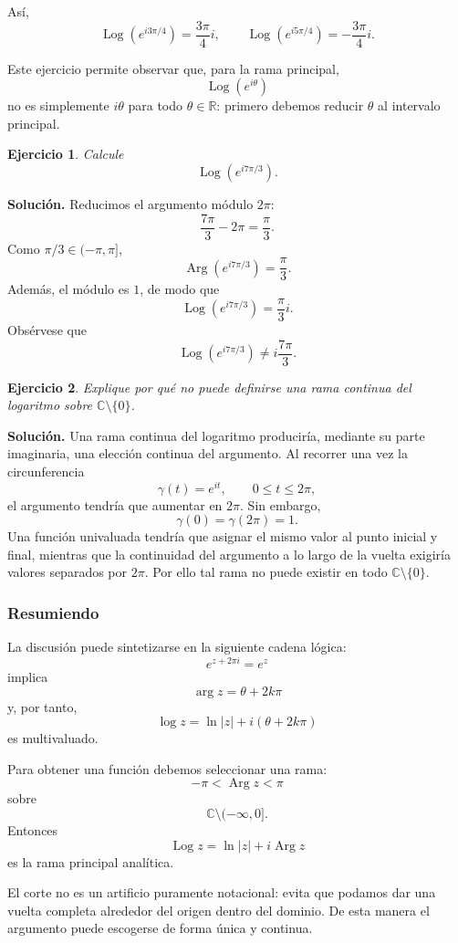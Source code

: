 \documentclass[12pt]{article}
\DeclareMathOperator{\Arg}{Arg}
\DeclareMathOperator{\Log}{Log}
\newtheorem{ejercicio}{Ejercicio}[section]
\begin{document}
Así,
\[
\boxed{
\Log(e^{i3\pi/4})=\frac{3\pi}{4}i,
\qquad
\Log(e^{i5\pi/4})=-\frac{3\pi}{4}i.
}
\]

Este ejercicio permite observar que, para la rama principal,
\[
\Log(e^{i\theta})
\]
no es simplemente $i\theta$ para todo $\theta\in\mathbb R$: primero debemos
reducir $\theta$ al intervalo principal.

\begin{ejercicio}
Calcule
\[
\Log(e^{i7\pi/3}).
\]
\end{ejercicio}

\textbf{Solución.}
Reducimos el argumento módulo $2\pi$:
\[
\frac{7\pi}{3}-2\pi
=
\frac{\pi}{3}.
\]
Como $\pi/3\in(-\pi,\pi]$,
\[
\Arg(e^{i7\pi/3})=\frac{\pi}{3}.
\]
Además, el módulo es $1$, de modo que
\[
\boxed{
\Log(e^{i7\pi/3})=\frac{\pi}{3}i.
}
\]
Obsérvese que
\[
\boxed{
\Log(e^{i7\pi/3})\neq i\frac{7\pi}{3}.
}
\]

\begin{ejercicio}
Explique por qué no puede definirse una rama continua del logaritmo sobre
$\mathbb C\setminus\{0\}$.
\end{ejercicio}

\textbf{Solución.}
Una rama continua del logaritmo produciría, mediante su parte imaginaria, una
elección continua del argumento. Al recorrer una vez la circunferencia
\[
\gamma(t)=e^{it},\qquad0\leq t\leq2\pi,
\]
el argumento tendría que aumentar en $2\pi$. Sin embargo,
\[
\gamma(0)=\gamma(2\pi)=1.
\]
Una función univaluada tendría que asignar el mismo valor al punto inicial y
final, mientras que la continuidad del argumento a lo largo de la vuelta
exigiría valores separados por $2\pi$. Por ello tal rama no puede existir en
todo $\mathbb C\setminus\{0\}$.
\subsubsection*{Resumiendo}
La discusión puede sintetizarse en la siguiente cadena lógica:
\[
\boxed{
e^{z+2\pi i}=e^z
}
\]
implica
\[
\boxed{
\arg z=\theta+2k\pi
}
\]
y, por tanto,
\[
\boxed{
\log z=\ln|z|+i(\theta+2k\pi)
}
\]
es multivaluado.

Para obtener una función debemos seleccionar una rama:
\[
\boxed{
-\pi<\Arg z<\pi
}
\]
sobre
\[
\boxed{
\mathbb C\setminus(-\infty,0].
}
\]
Entonces
\[
\boxed{
\Log z=\ln|z|+i\Arg z
}
\]
es la rama principal analítica.

El corte no es un artificio puramente notacional: evita que podamos dar una
vuelta completa alrededor del origen dentro del dominio. De esta manera el
argumento puede escogerse de forma única y continua.
\end{document}
